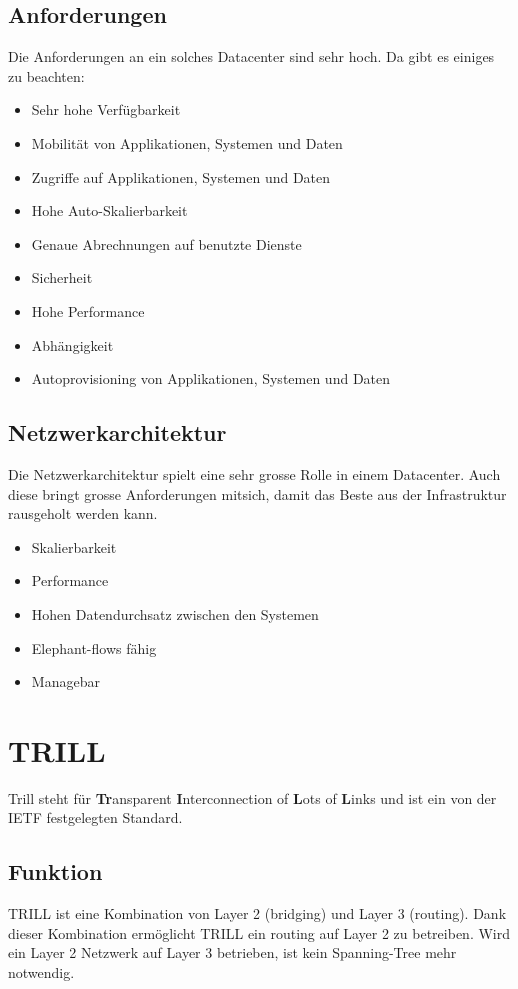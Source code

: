 \documentclass[a4,12pt]{scrartcl}
\begin{document}
\subsection{Anforderungen}
Die Anforderungen an ein solches Datacenter sind sehr hoch. Da gibt es einiges zu beachten: 
\begin{itemize}
\item Sehr hohe Verfügbarkeit 
\item Mobilität von Applikationen, Systemen und Daten
\item Zugriffe auf Applikationen, Systemen und Daten 
\item Hohe Auto-Skalierbarkeit 
\item Genaue Abrechnungen auf benutzte Dienste 
\item Sicherheit 
\item Hohe Performance 
\item Abhängigkeit 
\item Autoprovisioning von Applikationen, Systemen und Daten
\end{itemize}

\subsection{Netzwerkarchitektur}
Die Netzwerkarchitektur spielt eine sehr grosse Rolle in einem Datacenter. Auch diese bringt grosse Anforderungen mitsich, damit das Beste aus der Infrastruktur rausgeholt werden kann. 
\begin{itemize}
\item Skalierbarkeit
\item Performance 
\item Hohen Datendurchsatz zwischen den Systemen
\item Elephant-flows fähig 
\item Managebar 
\end{itemize}

\section{TRILL}
Trill steht für \textbf{Tr}ansparent \textbf{I}nterconnection of \textbf{L}ots of \textbf{L}inks und ist ein von der IETF festgelegten Standard.

\subsection{Funktion}
TRILL ist eine Kombination von Layer 2 (bridging) und Layer 3 (routing). Dank dieser Kombination ermöglicht TRILL ein routing auf Layer 2 zu betreiben. Wird ein Layer 2 Netzwerk auf Layer 3 betrieben, ist kein Spanning-Tree mehr notwendig.
\end{document}
